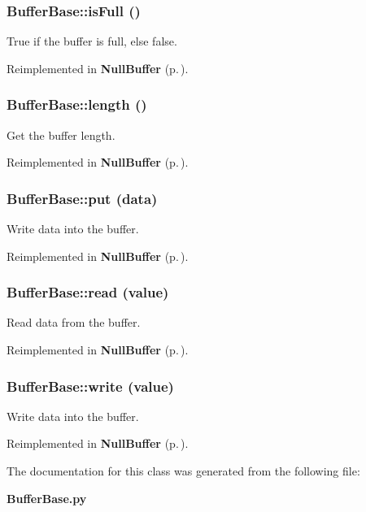 \subsubsection{\setlength{\rightskip}{0pt plus 5cm}Buffer\-Base::is\-Full ()}\label{classBufferBase_BufferBasea4}


True if the buffer is full, else false. 



Reimplemented in {\bf Null\-Buffer} {\rm (p.\,\pageref{classNullBuffer_NullBuffera6})}.
\subsubsection{\setlength{\rightskip}{0pt plus 5cm}Buffer\-Base::length ()}\label{classBufferBase_BufferBasea1}


Get the buffer length. 



Reimplemented in {\bf Null\-Buffer} {\rm (p.\,\pageref{classNullBuffer_NullBuffera3})}.
\subsubsection{\setlength{\rightskip}{0pt plus 5cm}Buffer\-Base::put (data)}\label{classBufferBase_BufferBasea6}


Write data into the buffer. 



Reimplemented in {\bf Null\-Buffer} {\rm (p.\,\pageref{classNullBuffer_NullBuffera9})}.
\subsubsection{\setlength{\rightskip}{0pt plus 5cm}Buffer\-Base::read (value)}\label{classBufferBase_BufferBasea3}


Read data from the buffer. 



Reimplemented in {\bf Null\-Buffer} {\rm (p.\,\pageref{classNullBuffer_NullBuffera5})}.
\subsubsection{\setlength{\rightskip}{0pt plus 5cm}Buffer\-Base::write (value)}\label{classBufferBase_BufferBasea2}


Write data into the buffer. 



Reimplemented in {\bf Null\-Buffer} {\rm (p.\,\pageref{classNullBuffer_NullBuffera4})}.

The documentation for this class was generated from the following file:\begin{CompactItemize}
\item 
{\bf Buffer\-Base.py}\end{CompactItemize}
